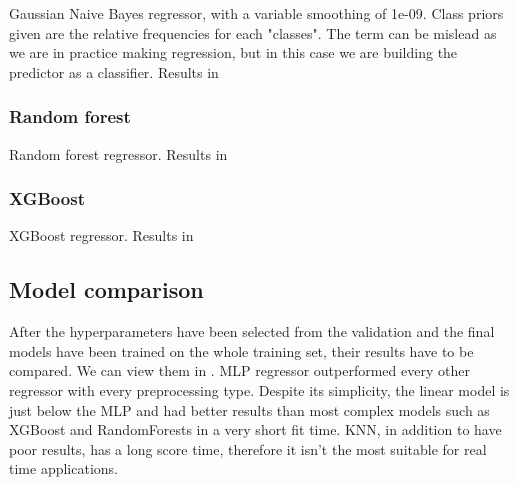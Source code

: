 Gaussian Naive Bayes regressor, with a variable smoothing of 1e-09. Class priors given are the relative frequencies for each "classes". The term can be mislead as we are in practice making regression, but in this case we are building the predictor as a classifier.
Results in 




\subsubsection{Random forest}

Random forest regressor.
Results in 




\subsubsection{XGBoost}

XGBoost regressor.
Results in 



\subsection{Model comparison}

After the hyperparameters have been selected from the validation and the final models have been trained on the whole training set, their results have to be compared. We can view them in .
MLP regressor outperformed every other regressor with every preprocessing type. Despite its simplicity, the linear model is just below the MLP and had better results than most complex models such as XGBoost and RandomForests in a very short fit time. KNN, in addition to have poor results, has a long score time, therefore it isn't the most suitable for real time applications.



